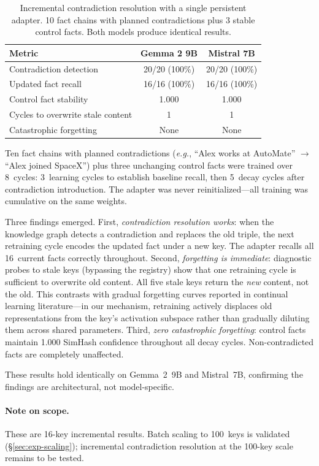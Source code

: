 \documentclass[11pt]{article}
\newcommand{\eg}{\textit{e.g.}}
\begin{document}
\begin{table}[t]
\centering
\caption{Incremental contradiction resolution with a single persistent adapter. 10 fact chains with planned contradictions plus 3 stable control facts. Both models produce identical results.}
\label{tab:contradictions}
\small
\begin{tabular}{@{}lcc@{}}
\toprule
\textbf{Metric} & \textbf{Gemma 2 9B} & \textbf{Mistral 7B} \\
\midrule
Contradiction detection & 20/20 (100\%) & 20/20 (100\%) \\
Updated fact recall & 16/16 (100\%) & 16/16 (100\%) \\
Control fact stability & 1.000 & 1.000 \\
Cycles to overwrite stale content & 1 & 1 \\
Catastrophic forgetting & None & None \\
\bottomrule
\end{tabular}
\end{table}
Ten fact chains with planned contradictions (\eg, ``Alex works at AutoMate'' $\rightarrow$ ``Alex joined SpaceX'') plus three unchanging control facts were trained over 8~cycles: 3~learning cycles to establish baseline recall, then 5~decay cycles after contradiction introduction.
The adapter was never reinitialized---all training was cumulative on the same weights.

Three findings emerged.
First, \emph{contradiction resolution works}: when the knowledge graph detects a contradiction and replaces the old triple, the next retraining cycle encodes the updated fact under a new key.
The adapter recalls all 16~current facts correctly throughout.
Second, \emph{forgetting is immediate}: diagnostic probes to stale keys (bypassing the registry) show that one retraining cycle is sufficient to overwrite old content.
All five stale keys return the \emph{new} content, not the old.
This contrasts with gradual forgetting curves reported in continual learning literature---in our mechanism, retraining actively displaces old representations from the key's activation subspace rather than gradually diluting them across shared parameters.
Third, \emph{zero catastrophic forgetting}: control facts maintain 1.000 SimHash confidence throughout all decay cycles.
Non-contradicted facts are completely unaffected.

These results hold identically on Gemma~2~9B and Mistral~7B, confirming the findings are architectural, not model-specific.

\paragraph{Note on scope.}
These are 16-key incremental results.
Batch scaling to 100~keys is validated (\S\ref{sec:exp-scaling}); incremental contradiction resolution at the 100-key scale remains to be tested.
\end{document}
